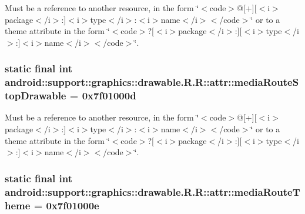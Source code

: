Must be a reference to another resource, in the form \char`\"{}$<$code$>$@\mbox{[}+\mbox{]}\mbox{[}$<$i$>$package$<$/i$>$:\mbox{]}$<$i$>$type$<$/i$>$:$<$i$>$name$<$/i$>$$<$/code$>$\char`\"{} or to a theme attribute in the form \char`\"{}$<$code$>$?\mbox{[}$<$i$>$package$<$/i$>$:\mbox{]}\mbox{[}$<$i$>$type$<$/i$>$:\mbox{]}$<$i$>$name$<$/i$>$$<$/code$>$\char`\"{}. \hypertarget{classandroid_1_1support_1_1graphics_1_1drawable_1_1_r_1_1attr_3ffb78bc30a56065dc7aaadf2e85da0e}{
\subsubsection[{mediaRouteStopDrawable}]{\setlength{\rightskip}{0pt plus 5cm}static final int android::support::graphics::drawable.R.R::attr::mediaRouteStopDrawable = 0x7f01000d}}
\label{classandroid_1_1support_1_1graphics_1_1drawable_1_1_r_1_1attr_3ffb78bc30a56065dc7aaadf2e85da0e}


Must be a reference to another resource, in the form \char`\"{}$<$code$>$@\mbox{[}+\mbox{]}\mbox{[}$<$i$>$package$<$/i$>$:\mbox{]}$<$i$>$type$<$/i$>$:$<$i$>$name$<$/i$>$$<$/code$>$\char`\"{} or to a theme attribute in the form \char`\"{}$<$code$>$?\mbox{[}$<$i$>$package$<$/i$>$:\mbox{]}\mbox{[}$<$i$>$type$<$/i$>$:\mbox{]}$<$i$>$name$<$/i$>$$<$/code$>$\char`\"{}. \hypertarget{classandroid_1_1support_1_1graphics_1_1drawable_1_1_r_1_1attr_5b06a4b07031904e3669a4b5b6babbaf}{
\subsubsection[{mediaRouteTheme}]{\setlength{\rightskip}{0pt plus 5cm}static final int android::support::graphics::drawable.R.R::attr::mediaRouteTheme = 0x7f01000e}}
\label{classandroid_1_1support_1_1graphics_1_1drawable_1_1_r_1_1attr_5b06a4b07031904e3669a4b5b6babbaf}


